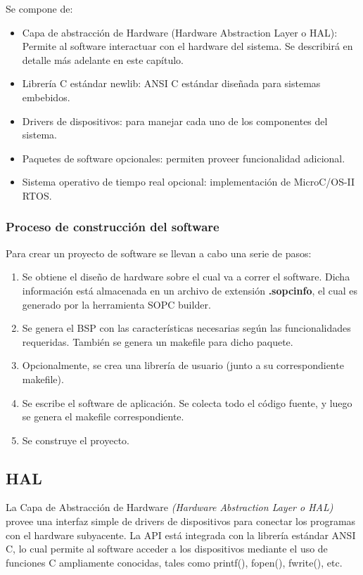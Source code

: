 Se compone de:

\begin{itemize}
	\item Capa de abstracción de Hardware (Hardware Abstraction Layer o HAL): Permite al software interactuar con el hardware del sistema. Se describirá en detalle más adelante en este capítulo.
	\item Librería C estándar newlib: ANSI C estándar diseñada para sistemas embebidos.
	\item Drivers de dispositivos: para manejar cada uno de los componentes del sistema.
	\item Paquetes de software opcionales: permiten proveer funcionalidad adicional.
	\item Sistema operativo de tiempo real opcional: implementación de MicroC/OS-II RTOS.
\end{itemize}

\subsubsection{Proceso de construcción del software}

Para crear un proyecto de software se llevan a cabo una serie de pasos:

\begin{enumerate}
	\item Se obtiene el diseño de hardware sobre el cual va a correr el software. Dicha información está almacenada en un archivo de extensión \textbf{.sopcinfo}, el cual es generado por la herramienta SOPC builder.
	\item Se genera el BSP con las características necesarias según las funcionalidades requeridas. También se genera un makefile para dicho paquete.
	\item Opcionalmente, se crea una librería de usuario (junto a su correspondiente makefile).
	\item Se escribe el software de aplicación. Se colecta todo el código fuente, y luego se genera el makefile correspondiente.
	\item Se construye el proyecto.
\end{enumerate}


\subsection {HAL}

La Capa de Abstracción de Hardware \textit{(Hardware Abstraction Layer o HAL)} provee una interfaz simple de drivers de dispositivos para conectar los programas con el hardware subyacente. La API está integrada con la librería estándar ANSI C, lo cual permite al software acceder a los dispositivos mediante el uso de funciones C ampliamente conocidas, tales como printf(), fopen(), fwrite(), etc.

